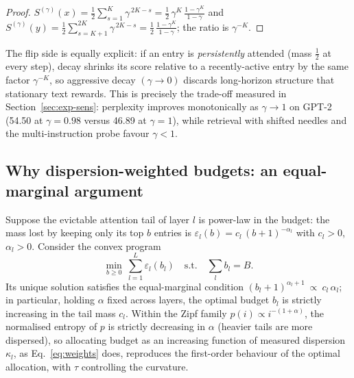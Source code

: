 \begin{proof}
$S^{(\gamma)}(x)=\tfrac12\sum_{s=1}^{K}\gamma^{\,2K-s}
=\tfrac12\,\gamma^{K}\,\frac{1-\gamma^{K}}{1-\gamma}$ and
$S^{(\gamma)}(y)=\tfrac12\sum_{s=K+1}^{2K}\gamma^{\,2K-s}
=\tfrac12\,\frac{1-\gamma^{K}}{1-\gamma}$; the ratio is
$\gamma^{-K}$.
\end{proof}

The flip side is equally explicit: if an entry is \emph{persistently}
attended (mass $\tfrac12$ at every step), decay shrinks its score
relative to a recently-active entry by the same factor $\gamma^{-K}$, so
aggressive decay $(\gamma\to0)$ discards long-horizon structure that
stationary text rewards. This is precisely the trade-off measured in
Section~\ref{sec:exp-sens}: perplexity improves monotonically as
$\gamma\to1$ on GPT-2 (54.50 at $\gamma=0.98$ versus 46.89 at
$\gamma=1$), while retrieval with shifted needles and the
multi-instruction probe favour $\gamma<1$.

\subsection{Why dispersion-weighted budgets: an equal-marginal argument}

\begin{proposition}
\label{prop:marginal}
Suppose the evictable attention tail of layer $l$ is power-law in the
budget: the mass lost by keeping only its top $b$ entries is
$\varepsilon_l(b)=c_l\,(b+1)^{-\alpha_l}$ with $c_l>0$, $\alpha_l>0$.
Consider the convex program
\begin{equation}
\min_{b\ge0}\ \sum_{l=1}^{L}\varepsilon_l(b_l)
\quad\text{s.t.}\quad \sum_l b_l = B .
\end{equation}
Its unique solution satisfies the equal-marginal condition
$(b_l+1)^{\alpha_l+1}\ \propto\ c_l\,\alpha_l$; in particular, holding
$\alpha$ fixed across layers, the optimal budget $b_l$ is strictly
increasing in the tail mass $c_l$. Within the Zipf family
$p(i)\propto i^{-(1+\alpha)}$, the normalised entropy of $p$ is strictly
decreasing in $\alpha$ (heavier tails are more dispersed), so allocating
budget as an increasing function of measured dispersion $\kappa_l$, as
Eq.~\eqref{eq:weights} does, reproduces the first-order behaviour of the
optimal allocation, with $\tau$ controlling the curvature.
\end{proposition}

